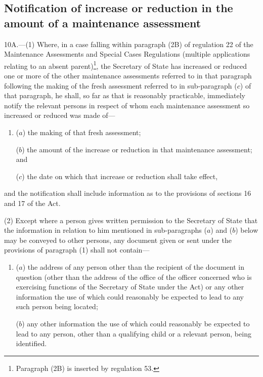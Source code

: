 \documentclass[a4paper,12pt]{article}
\begin{document}
\subsection[10A. Notification of increase or reduction in the amount of a maintenance assessment]{Notification of increase or reduction in the amount of a maintenance assessment}

10A.—(1) Where, in a case falling within paragraph (2B) of regulation 22 of the Maintenance Assessments and Special Cases Regulations (multiple applications relating to an absent parent)\footnote{\frenchspacing Paragraph (2B) is inserted by regulation 53.}, 
the Secretary of State  %
has increased or reduced one or more of the other maintenance assessments referred to in that paragraph following the making of the fresh assessment referred to in sub-paragraph ($c$) of that paragraph, he shall, so far as that is reasonably practicable, immediately notify the relevant persons in respect of whom each maintenance assessment so increased or reduced was made of—
\begin{enumerate}\item[]
($a$) the making of that fresh assessment;

($b$) the amount of the increase or reduction in that maintenance assessment; and

($c$) the date on which that increase or reduction shall take effect,
\end{enumerate}
and the notification shall include information as to the provisions of 
sections 16 and 17  %
of the Act.

(2) Except where a person gives written permission to the Secretary of State that the information in relation to him mentioned in sub-paragraphs ($a$) and ($b$) below may be conveyed to other persons, any document given or sent under the provisions of paragraph (1) shall not contain—
\begin{enumerate}\item[]
($a$) the address of any person other than the recipient of the document in question (other than the address of the office 
of the officer concerned who is exercising functions of the Secretary of State under the Act)  %
or any other information the use of which could reasonably be expected to lead to any such person being located;

($b$) any other information the use of which could reasonably be expected to lead to any person, other than a qualifying child or a relevant person, being identified.
\end{enumerate}
\end{document}
